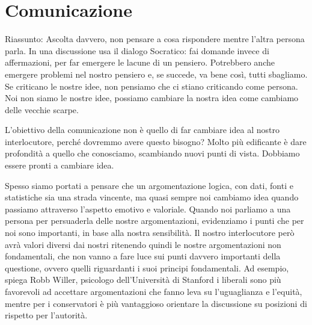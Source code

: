 \documentclass[12pt]{book} %
\begin{document}
\clearpage\section{Comunicazione}

\begin{mdframed}[linewidth=1pt]
Riassunto: Ascolta davvero, non pensare a cosa rispondere mentre l'altra persona parla. In una discussione usa il dialogo Socratico: fai domande invece di affermazioni, per far emergere le lacune di un pensiero. Potrebbero anche emergere problemi nel nostro pensiero e, se succede, va bene così, tutti sbagliamo. Se criticano le nostre idee, non pensiamo che ci stiano criticando come persona. Noi non siamo le nostre idee, possiamo cambiare la nostra idea come cambiamo delle vecchie scarpe.
\end{mdframed}

L'obiettivo della comunicazione non è quello di far cambiare idea al nostro interlocutore, perché dovremmo avere questo bisogno?
Molto più edificante è dare profondità a quello che conosciamo, scambiando nuovi punti di vista. Dobbiamo essere pronti a cambiare idea.

Spesso siamo portati a pensare che un argomentazione logica, con dati, fonti e statistiche sia una strada vincente, ma
quasi sempre noi cambiamo idea quando passiamo attraverso l'aspetto emotivo e valoriale. Quando
noi parliamo a una persona per persuaderla delle nostre argomentazioni, evidenziamo i punti che per noi sono
importanti, in base alla nostra sensibilità. Il nostro interlocutore però avrà valori diversi dai nostri ritenendo
quindi le nostre argomentazioni non fondamentali, che non vanno a fare luce sui punti davvero importanti della
questione, ovvero quelli riguardanti i suoi principi fondamentali.
Ad esempio, spiega Robb Willer, psicologo dell'Università di Stanford i liberali sono più favorevoli ad accettare argomentazioni
che fanno leva su l'uguaglianza e l'equità, mentre per i conservatori è più vantaggioso orientare la discussione su
posizioni di rispetto per l'autorità.
\end{document}
